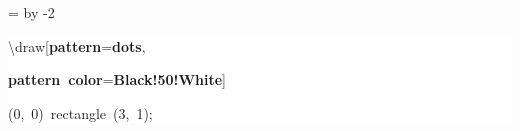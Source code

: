 \begingroup
\ttfamily
{}
=\textwidth
\advance{} by -2\fboxsep
\noindent
\colorbox{background}
{%
\parbox{\dimen255}
{%
\rule[-0.5ex]{0pt}{2.5ex}\hspace*{0.0em}\textbackslash{}draw[\textcolor{R}{\textbf{pattern}}=\textcolor{B}{\textbf{dots}},\\
\rule[-0.5ex]{0pt}{2.5ex}\hspace*{3.0em}\textcolor{R}{\textbf{pattern~color}}=\textcolor{B}{\textbf{Black!50!White}}]\\
\rule[-0.5ex]{0pt}{2.5ex}\hspace*{3.0em}(0,~0)~rectangle~(3,~1);}%
}%
\endgroup

